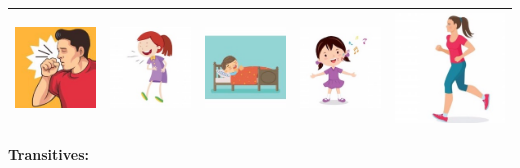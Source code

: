 \documentclass[12pt,notitlepage]{article}
\begin{document}
\begin{center}
\begin{tabular}{|c||c||c||c||c|}
\includegraphics[width=0.13\columnwidth]{square/I18.jpg} &  \includegraphics[width=0.13\columnwidth]{square/I20.jpg} &  \includegraphics[width=0.13\columnwidth]{square/I24.jpg} & \includegraphics[width=0.13\columnwidth]{square/I27.jpg} & \includegraphics[width=0.13\columnwidth]{square/I30.jpg} \\
\hline
\end{tabular}

\textbf{Transitives:}


\end{center}
\end{document}
